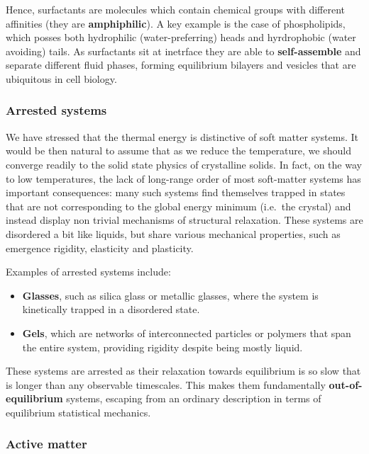 \documentclass[
  letterpaper,
  enabledeprecatedfontcommands]{report}
\providecommand{\tightlist}{%
  \setlength{\itemsep}{0pt}\setlength{\parskip}{0pt}}
\begin{document}
Hence, surfactants are molecules which contain chemical groups with
different affinities (they are \textbf{amphiphilic}). A key example is
the case of phospholipids, which posses both hydrophilic
(water-preferring) heads and hyrdrophobic (water avoiding) tails. As
surfactants sit at inetrface they are able to \textbf{self-assemble} and
separate different fluid phases, forming equilibrium bilayers and
vesicles that are ubiquitous in cell biology.

\subsubsection*{Arrested systems}\label{arrested-systems}

We have stressed that the thermal energy is distinctive of soft matter
systems. It would be then natural to assume that as we reduce the
temperature, we should converge readily to the solid state physics of
crystalline solids. In fact, on the way to low temperatures, the lack of
long-range order of most soft-matter systems has important consequences:
many such systems find themselves trapped in states that are not
corresponding to the global energy minimum (i.e.~the crystal) and
instead display non trivial mechanisms of structural relaxation. These
systems are disordered a bit like liquids, but share various mechanical
properties, such as emergence rigidity, elasticity and plasticity.

Examples of arrested systems include:

\begin{itemize}
\tightlist
\item
  \textbf{Glasses}, such as silica glass or metallic glasses, where the
  system is kinetically trapped in a disordered state.
\item
  \textbf{Gels}, which are networks of interconnected particles or
  polymers that span the entire system, providing rigidity despite being
  mostly liquid.
\end{itemize}

These systems are arrested as their relaxation towards equilibrium is so
slow that is longer than any observable timescales. This makes them
fundamentally \textbf{out-of-equilibrium} systems, escaping from an
ordinary description in terms of equilibrium statistical mechanics.

\subsubsection*{Active matter}\label{active-matter}
\end{document}
